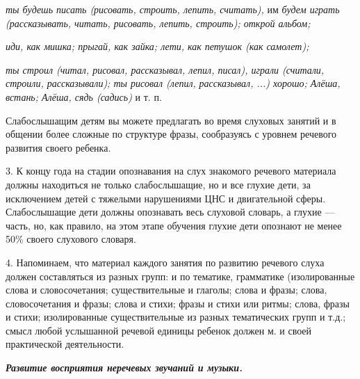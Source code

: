 \documentclass{book}
\renewcommand{\emph}[1]{\textit{#1}}
\begin{document}
\emph{ты будешь писать (рисовать, строить, лепить, считать),} им
\emph{будем играть (рассказывать, читать, рисовать, лепить, строить);
открой альбом;}

\emph{иди, как мишка; прыгай, как зайка; лети, как петушок (как
самолет);}

\emph{ты строил (читал, рисовал, рассказывал, лепил, писал), играли
(считали, строили, рассказывали); ты рисовал (лепил,} \emph{рассказывал,
...) хорошо; Алёша, встань; Алёша, сядь (садись)} и т. п.

Слабослышащим детям вы можете предлагать во время слуховых занятий и в
общении более сложные по структуре фразы, сообразуясь с уровнем речевого
развития своего ребенка.

3. К концу года на стадии опознавания на слух знакомого речевого
материала должны находиться не только слабослышащие, но и все глухие
дети, за исключением детей с тяжелыми нарушениями ЦНС и двигательной
сферы. Слабослышащие дети должны опознавать весь слуховой словарь, а
глухие --- часть, но, как правило, на этом этапе обучения глухие дети
опознают не менее 50\% своего слухового словаря.

4. Напоминаем, что материал каждого занятия по развитию речевого слуха
должен составляться из разных групп: и по тематике, грамматике
(изолированные слова и словосочетания; существительные и глаголы; слова
и фразы; слова, словосочетания и фразы; слова и стихи; фразы и стихи или
ритмы; слова, фразы и стихи; изолированные существительные из разных
тематических групп и т.д.; смысл любой услышанной речевой единицы
ребенок должен м. и своей практической деятельности.

\emph{\textbf{Развитие восприятия неречевых звучаний и музыки.}}
\end{document}

